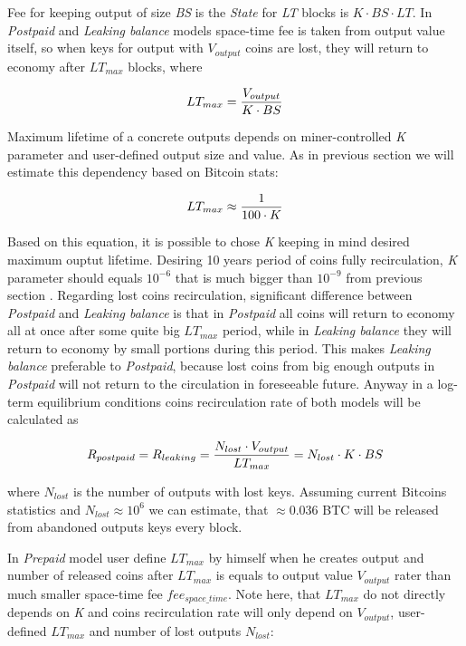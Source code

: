 \documentclass[]{article}   %
\newcommand{\authnote}[2]{\marginpar{\parbox{\marginparwidth}{\tiny %
  \textsf{#1 {\textcolor{blue}{notes: #2}}}}}%
  \textcolor{blue}{\textbf{\dag}}}
\newcommand{\authnote}[2]{
  \textsf{#1 \textcolor{blue}{: #2}}}
\newcommand{\authnote}[2]{}
\newcommand{\dnote}[1]{{\authnote{\textcolor{blue}{Dima notes}}{#1}}}
\newcommand{\state}{\textit{State}}
\begin{document}
Fee for keeping output of size \textit{BS} is the \state{} for \textit{LT} blocks is ${K \cdot BS \cdot LT}$. In \textit{Postpaid} and \textit{Leaking balance} models space-time fee is taken from output value itself, so when keys for output with \textit{$V_{output}$} coins are lost, they will return to economy after \textit{$LT_{max}$} blocks, where

\begin{equation}
{LT_{max} = {V_{output} \over K \cdot BS}}
\end{equation}

Maximum lifetime of a concrete outputs depends on miner-controlled \textit{K} parameter and user-defined output size and value. As in previous section we will estimate this dependency based on Bitcoin stats:

\begin{equation}
{LT_{max} \approx {1 \over 100 \cdot K}}
\end{equation}

Based on this equation, it is possible to chose \textit{K} keeping in mind desired maximum ouptut lifetime. Desiring 10 years period of coins fully recirculation, \textit{K} parameter should equals $10^{-6}$ that is much bigger than $10^{-9}$ from previous section \dnote{$??? 10 is too small, you'll be able to spend only hlaf of your money after 5 years$}. Regarding lost coins recirculation, significant difference between \textit{Postpaid} and \textit{Leaking balance} is that in \textit{Postpaid} all coins will return to economy all at once after some quite big $LT_{max}$ period, while in \textit{Leaking balance} they will return to economy by small portions during this period. This makes \textit{Leaking balance} preferable to \textit{Postpaid}, because lost coins from big enough outputs in \textit{Postpaid} will not return to the circulation in foreseeable future. Anyway in a log-term equilibrium conditions coins recirculation rate of both models will be calculated as

\begin{equation}
R_{postpaid} = R_{leaking} = {N_{lost} \cdot V_{output} \over LT_{max}} = {N_{lost} \cdot K \cdot BS}
\end{equation}

where $N_{lost}$ is the number of outputs with lost keys. Assuming current Bitcoins statistics and $N_{lost}\approx10^6$ we can estimate, that $\approx0.036$ BTC will be released from abandoned outputs keys every block.

In \textit{Prepaid} model user define $LT_{max}$ by himself when he creates output and number of released coins after $LT_{max}$ is equals to output value $V_{output}$ rater than much smaller space-time fee $fee_{space\_time}$. Note here, that $LT_{max}$ do not directly depends on \textit{K} and coins recirculation rate will only depend on $V_{output}$, user-defined $LT_{max}$ and number of lost outputs $N_{lost}$:
\end{document}
